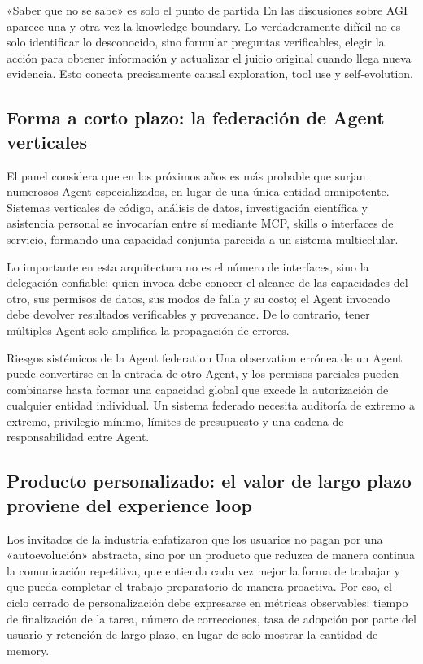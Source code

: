 \begin{knowledgebox}{«Saber que no se sabe» es solo el punto de partida}
En las discusiones sobre AGI aparece una y otra vez la knowledge boundary. Lo verdaderamente difícil no es solo identificar lo desconocido, sino formular preguntas verificables, elegir la acción para obtener información y actualizar el juicio original cuando llega nueva evidencia. Esto conecta precisamente causal exploration, tool use y self-evolution.
\end{knowledgebox}

\subsection{Forma a corto plazo: la federación de Agent verticales}

El panel considera que en los próximos años es más probable que surjan numerosos Agent especializados, en lugar de una única entidad omnipotente. Sistemas verticales de código, análisis de datos, investigación científica y asistencia personal se invocarían entre sí mediante MCP, skills o interfaces de servicio, formando una capacidad conjunta parecida a un sistema multicelular.

Lo importante en esta arquitectura no es el número de interfaces, sino la delegación confiable: quien invoca debe conocer el alcance de las capacidades del otro, sus permisos de datos, sus modos de falla y su costo; el Agent invocado debe devolver resultados verificables y provenance. De lo contrario, tener múltiples Agent solo amplifica la propagación de errores.

\begin{warningbox}{Riesgos sistémicos de la Agent federation}
Una observation errónea de un Agent puede convertirse en la entrada de otro Agent, y los permisos parciales pueden combinarse hasta formar una capacidad global que excede la autorización de cualquier entidad individual. Un sistema federado necesita auditoría de extremo a extremo, privilegio mínimo, límites de presupuesto y una cadena de responsabilidad entre Agent.
\end{warningbox}

\subsection{Producto personalizado: el valor de largo plazo proviene del experience loop}

Los invitados de la industria enfatizaron que los usuarios no pagan por una «autoevolución» abstracta, sino por un producto que reduzca de manera continua la comunicación repetitiva, que entienda cada vez mejor la forma de trabajar y que pueda completar el trabajo preparatorio de manera proactiva. Por eso, el ciclo cerrado de personalización debe expresarse en métricas observables: tiempo de finalización de la tarea, número de correcciones, tasa de adopción por parte del usuario y retención de largo plazo, en lugar de solo mostrar la cantidad de memory.

